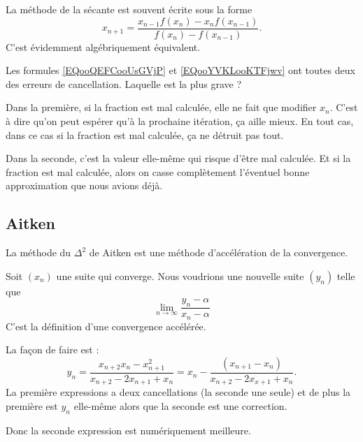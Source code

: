 \begin{remark}
    La méthode de la sécante est souvent écrite sous la forme
    \begin{equation}        \label{EQooYVKLooKTFjwv}
        x_{n+1}=\frac{ x_{n-1}f(x_n)-x_nf(x_{n-1}) }{ f(x_n)-f(x_{n-1}) }.
    \end{equation}
    C'est évidemment algébriquement équivalent. 

    Les formules \eqref{EQooQEFCooUsGVjP} et \eqref{EQooYVKLooKTFjwv} ont toutes deux des erreurs de cancellation. Laquelle est la plus grave ?

    Dans la première, si la fraction est mal calculée, elle ne fait que modifier \( x_n\). C'est à dire qu'on peut espérer qu'à la prochaine itération, ça aille mieux. En tout cas, dans ce cas si la fraction est mal calculée, ça ne détruit pas tout.

    Dans la seconde, c'est la valeur elle-même qui risque d'être mal calculée. Et si la fraction est mal calculée, alors on casse complètement l'éventuel bonne approximation que nous avions déjà.
\end{remark}

\subsection{Aitken}

La méthode du \( \Delta^2\) de Aitken est une méthode d'accélération de la convergence.

Soit \( (x_n)\) une suite qui converge. Nous voudrions une nouvelle suite \( (y_n)\) telle que
\begin{equation}
    \lim_{n\to \infty} \frac{ y_n-\alpha }{ x_n-\alpha }
\end{equation}
C'est la définition d'une convergence accélérée.

La façon de faire est :
\begin{equation}
    y_n=\frac{ x_{n+2}x_n-x_{n+1}^2 }{ x_{n+2}-2x_{n+1}+x_n }=x_n-\frac{ (x_{n+1}-x_n) }{ x_{n+2}-2x_{x+1}+x_n }.
\end{equation}
La première expressions a deux cancellations (la seconde une seule) et de plus la première est $y_n$ elle-même alors que la seconde est une correction.

Donc la seconde expression est numériquement meilleure.

